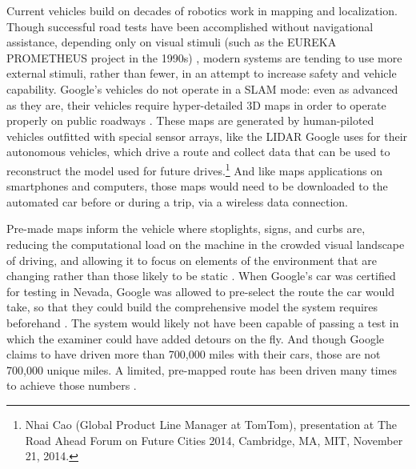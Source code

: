 
Current vehicles build on decades of robotics work in mapping and localization. Though successful
road tests have been accomplished without navigational assistance,
depending only on visual stimuli (such as the EUREKA PROMETHEUS project
in the 1990s) \cite{ulmerVITA}, modern systems are tending to use more external
stimuli, rather than fewer, in an attempt to increase safety and
vehicle capability. Google's vehicles do not operate in a SLAM mode: even as
advanced as they are, their vehicles require
hyper-detailed 3D maps in order to operate properly on public
roadways \cite{gomesObstacles}. These maps are generated by human-piloted vehicles outfitted with
special sensor arrays, like the LIDAR Google uses for their autonomous
vehicles, which drive a route and collect data that can be used to
reconstruct the model used for future drives.\footnote{Nhai Cao
  (Global Product Line Manager at TomTom), presentation at The Road
  Ahead Forum on Future Cities 2014, Cambridge, MA, MIT, November 21,
  2014.} And like maps applications on smartphones and computers,
those maps would need to be downloaded to the automated car before or
during a trip, via a wireless data connection.


Pre-made maps inform the vehicle where stoplights, signs,
and curbs are, reducing the computational load on the machine in the
crowded visual landscape of driving, and allowing it to focus on
elements of the environment that are changing rather than those likely
to be static \cite{gomesObstacles}. When Google's car was certified for
testing in Nevada, Google was allowed to pre-select the route the car
would take, so that they could build the comprehensive model the
system requires beforehand \cite{harrisNevada}. The system would likely not have been
capable of passing a test in which the examiner could have added
detours on the fly. And though Google claims to have driven more than
700,000 miles with their cars, those are not 700,000 unique miles. A
limited, pre-mapped route has been driven many times to
achieve those numbers \cite{gomesCircles}.

